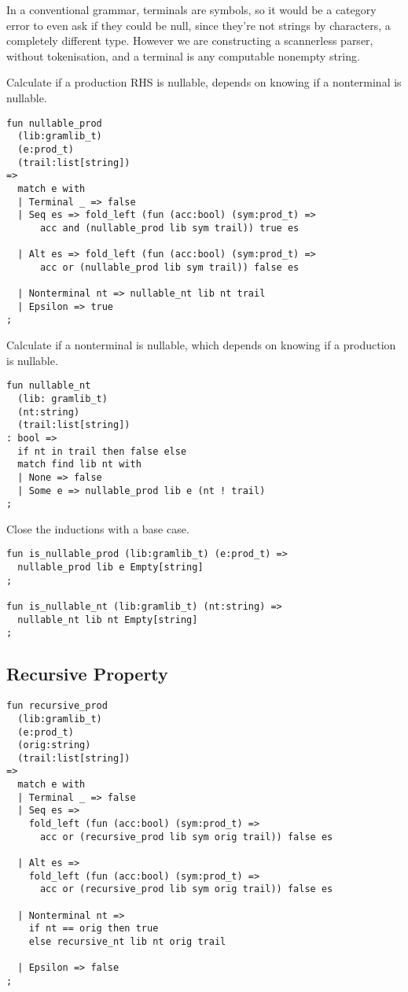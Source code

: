 \documentclass[oneside]{book}
\begin{document}
In a conventional grammar, terminals are symbols, so it would be a
category error to even ask if they could be null, since they're not
strings by characters, a completely different type. However
we are constructing a scannerless parser, without tokenisation,
and a terminal is any computable nonempty string.


Calculate if a production RHS is nullable, depends on
knowing if a nonterminal is nullable.

\begin{verbatim}
fun nullable_prod 
  (lib:gramlib_t) 
  (e:prod_t) 
  (trail:list[string]) 
=>
  match e with
  | Terminal _ => false
  | Seq es => fold_left (fun (acc:bool) (sym:prod_t) => 
      acc and (nullable_prod lib sym trail)) true es

  | Alt es => fold_left (fun (acc:bool) (sym:prod_t) => 
      acc or (nullable_prod lib sym trail)) false es

  | Nonterminal nt => nullable_nt lib nt trail
  | Epsilon => true
;
\end{verbatim}

Calculate if a nonterminal is nullable, which depends on
knowing if a production is nullable.

\begin{verbatim}
fun nullable_nt 
  (lib: gramlib_t) 
  (nt:string) 
  (trail:list[string]) 
: bool =>
  if nt in trail then false else
  match find lib nt with
  | None => false
  | Some e => nullable_prod lib e (nt ! trail)
;
\end{verbatim}

Close the inductions with a base case.

\begin{verbatim}
fun is_nullable_prod (lib:gramlib_t) (e:prod_t) => 
  nullable_prod lib e Empty[string]
;

fun is_nullable_nt (lib:gramlib_t) (nt:string) => 
  nullable_nt lib nt Empty[string]
;
\end{verbatim}


\subsection{Recursive Property}
\begin{verbatim}
fun recursive_prod 
  (lib:gramlib_t) 
  (e:prod_t) 
  (orig:string) 
  (trail:list[string]) 
=>
  match e with
  | Terminal _ => false
  | Seq es => 
    fold_left (fun (acc:bool) (sym:prod_t) => 
      acc or (recursive_prod lib sym orig trail)) false es

  | Alt es => 
    fold_left (fun (acc:bool) (sym:prod_t) => 
      acc or (recursive_prod lib sym orig trail)) false es

  | Nonterminal nt => 
    if nt == orig then true 
    else recursive_nt lib nt orig trail

  | Epsilon => false
;
\end{verbatim}
\end{document}
